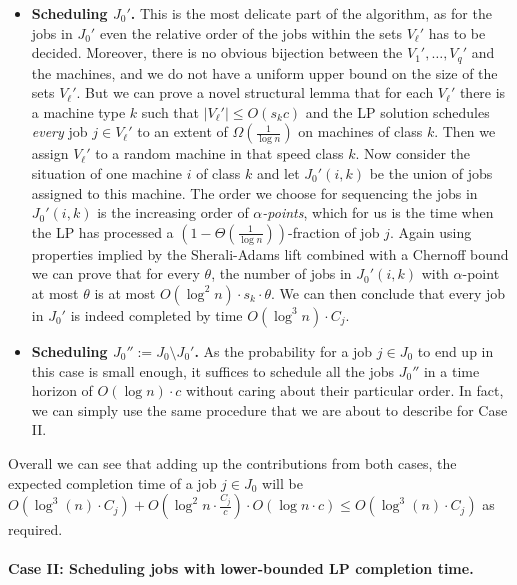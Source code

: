   \begin{itemize}
  \item {\bf Scheduling $J_0'$.} This is the most delicate part of the algorithm, as for the jobs in $J_0'$ even the relative order of the jobs within the sets $V_{\ell}'$ has to be decided. Moreover, there is no obvious bijection between the $V_1',\ldots,V_q'$ and the machines, and we do not have a uniform upper bound on the size of the sets $V_{\ell}'$. But we can prove a novel structural lemma that for each $V_{\ell}'$ there is a machine type $k$ such that $|V_{\ell}'| \leq O(s_kc)$ and the LP solution schedules \emph{every} job $j \in V_{\ell}'$ to an extent of $\Omega(\frac{1}{\log n})$ on machines of class $k$. Then we assign $V_{\ell}'$ to a random machine in that speed class $k$. Now consider the situation of one machine $i$ of class $k$ and let $J_0'(i,k)$ be the union of jobs assigned to this machine. The order we choose for sequencing the jobs in  $J_0'(i,k)$  is the increasing order of  \emph{$\alpha$-points}, which for us is the time when the LP has processed a  $(1-\Theta(\frac{1}{\log n}))$-fraction of job $j$. Again using properties implied by the Sherali-Adams lift combined with a Chernoff bound we can prove that for every $\theta$, the number of jobs in $J_0'(i,k)$ with $\alpha$-point at most $\theta$ is at most $O(\log^2 n) \cdot s_k \cdot \theta$. We can then conclude that every job in $J_0'$ is indeed completed by time $O(\log^3 n) \cdot C_j$.
  \item {\bf Scheduling $J_0'' := J_0 \setminus J_0'$.} As the probability for a job $j \in J_0$ to end up in this case is small enough, it suffices to schedule all the jobs $J_0''$ in a time horizon of $O(\log n) \cdot c$ without caring about their particular order. 
  In fact, we can simply use the same procedure that we are about to describe for Case II. 
  \end{itemize}
  Overall we can see that adding up the contributions from both cases, the expected completion time of a job $j \in J_0$ will be $O(\log^3 (n) \cdot C_j) + O(\log^2 n \cdot \frac{C_j}{c}) \cdot O(\log n \cdot c) \leq O(\log^3(n) \cdot C_j)$ as required. 
  
  
  \paragraph{Case II: Scheduling jobs with lower-bounded LP completion time.}
  
